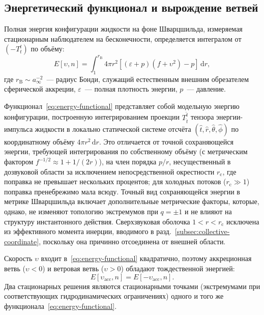 \documentclass[12pt,a4paper,preprint]{elsarticle}
\begin{document}
        \subsection{Энергетический функционал и вырождение ветвей}\label{subsec:energy-functional}
            Полная энергия конфигурации жидкости на фоне Шварцшильда, измеряемая стационарным наблюдателем на бесконечности, определяется интегралом от $(-T^{t}_{t})$ по объёму:
            \begin{equation}
                E[\upsilon, n] = \int_{1}^{r_{\mathrm{B}}} 4\pi r^{2}\left[(\varepsilon + p)(f + \upsilon^{2}) - p\right]\,\mathrm{d}r,
                \label{eq:energy-functional}
            \end{equation}
            где $r_{\mathrm{B}} \sim a_{\infty}^{-2}$~--- радиус Бонди, служащий естественным внешним обрезателем сферической аккреции, $\varepsilon$~--- полная плотность энергии, $p$~--- давление.

            Функционал~\eqref{eq:energy-functional} представляет собой модельную энергию конфигурации, построенную интегрированием проекции $T^{\hat{t}}_{\hat{t}}$ тензора энергии-импульса жидкости в локально статической системе отсчёта $(\hat{t}, \hat{r}, \hat{\theta}, \hat{\phi})$ по координатному объёму $4\pi r^{2}\,\mathrm{d}r$. Это отличается от точной сохраняющейся энергии, требующей интегрирования по собственному объёму (с метрическим фактором $f^{-1/2} \approx 1 + 1/(2r)$), на член порядка $p/r$, несущественный в дозвуковой области за исключением непосредственной окрестности $r_{\mathrm{c}}$, где поправка не превышает нескольких процентов; для холодных потоков ($r_{\mathrm{c}} \gg 1$) поправка пренебрежимо мала всюду. Точный вид сохраняющейся энергии в метрике Шварцшильда включает дополнительные метрические факторы, которые, однако, не изменяют топологию экстремумов при $q = \pm 1$ и не влияют на структуру инстантонного действия. Сверхзвуковая оболочка $1 < r < r_{\mathrm{c}}$ исключена из эффективного момента инерции, вводимого в разд.~\ref{subsec:collective-coordinate}, поскольку она причинно отсоединена от внешней области.

            Скорость $\upsilon$ входит в~\eqref{eq:energy-functional} квадратично, поэтому аккреционная ветвь ($\upsilon < 0$) и ветровая ветвь ($\upsilon > 0$) обладают тождественной энергией:
            \begin{equation}
                E[\upsilon_{\mathrm{acc}}, n] = E[-\upsilon_{\mathrm{acc}}, n].
                \label{eq:energy-degeneracy}
            \end{equation}
            Два стационарных решения являются стационарными точками (экстремумами при соответствующих гидродинамических ограничениях) одного и того же функционала~\eqref{eq:energy-functional}.
            
\end{document}

